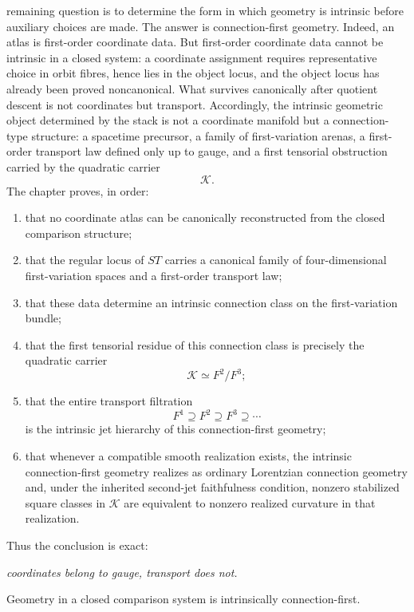 remaining question is to determine the form in which geometry is
intrinsic before auxiliary choices are made.
The answer is connection-first geometry.
Indeed, an atlas is first-order coordinate data.  But first-order
coordinate data cannot be intrinsic in a closed system: a coordinate
assignment requires representative choice in orbit fibres, hence lies in
the object locus, and the object locus has already been proved
noncanonical.  What survives canonically after quotient descent is not
coordinates but transport.  Accordingly, the intrinsic geometric object
determined by the stack is not a coordinate manifold but a connection-type
structure: a spacetime precursor, a family of first-variation arenas, a
first-order transport law defined only up to gauge, and a first
tensorial obstruction carried by the quadratic carrier
\[
	\mathcal K.
\]
The chapter proves, in order:
\begin{enumerate}[label=\textup{(\roman*)}]
	\item
	      that no coordinate atlas can be canonically reconstructed from the
	      closed comparison structure;
	\item
	      that the regular locus of \(ST\) carries a canonical family of
	      four-dimensional first-variation spaces and a first-order transport law;
	\item
	      that these data determine an intrinsic connection class on the
	      first-variation bundle;
	\item
	      that the first tensorial residue of this connection class is precisely
	      the quadratic carrier
	      \[
		      \mathcal K\simeq F^2/F^3;
	      \]
	\item
	      that the entire transport filtration
	      \[
		      F^1\supseteq F^2\supseteq F^3\supseteq\cdots
	      \]
	      is the intrinsic jet hierarchy of this connection-first geometry;
	\item
	      that whenever a compatible smooth realization exists, the intrinsic
	      connection-first geometry realizes as ordinary Lorentzian connection
	      geometry and, under the inherited second-jet faithfulness condition,
	      nonzero stabilized square classes in \(\mathcal K\) are equivalent
	      to nonzero realized curvature in that realization.
\end{enumerate}
Thus the conclusion is exact:
\medskip
\begin{center}
	\emph{coordinates belong to gauge, transport does not.}
\end{center}
\medskip
Geometry in a closed comparison system is intrinsically
connection-first.
